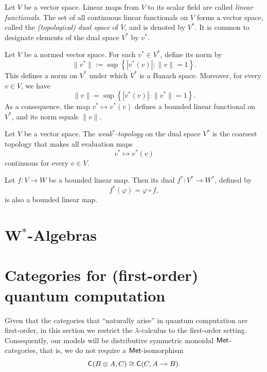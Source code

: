\begin{definition}
  Let $V$ be a vector space. 
  Linear maps from $V$ to its scalar field are called \emph{linear functionals}. The set of all continuous linear functionals on $V$ forms a vector space, called the \emph{(topological) dual space} of $ V $, and is denoted by $V^*$. It is common to designate elements of the dual space \( V^* \)  by \( v^* \).  %
\end{definition}



\begin{theorem} \cite[Theorem 4.3]{rudin91functional} %
Let \( V \) be a normed vector space. For each \( v^* \in V^* \), define its norm by
\[
\|v^*\| := \sup \left\{ | v^*(v) | : \|v\| = 1 \right\}.
\]
This defines a norm on \( V^* \) under which \( V^* \) is a Banach space. Moreover, for every \( v \in V \), we have
\[
\|v\| = \sup \left\{ | v^*(v) | : \|v^*\| = 1 \right\}.
\]
As a consequence, the map \( v^* \mapsto v^*(v)  \) defines a bounded linear functional on \( V^* \), and its norm equals \( \|v\| \).
\end{theorem}

\begin{definition}
Let \( V \) be a vector space. The \emph{weak\(^*\)-topology} on the dual space \( V^* \) is the coarsest topology that makes all evaluation maps
\[
v^* \mapsto v^*(v) 
\]
continuous for every \( v \in V \).
\end{definition}

\begin{proposition} \cite[Proposition 2.3.10]{pedersenAnalysisNow1989}
Let \( f : V \to W \) be a bounded linear map. Then its dual \( f^* : V^* \to W^* \), defined by
\[
f^*(\varphi) = \varphi \circ f,
\]
is also a bounded linear map.
\end{proposition}


\section{W$^*$-Algebras}

\section{Categories for (first-order) quantum computation}

Given that the categories that ``naturally arise'' in quantum computation are first-order, in this section we restrict the $\lambda$-calculus to the first-order setting. Consequently, our models will be distributive symmetric monoidal $\mathsf{Met}$-categories, that is, we do not require a $\mathsf{Met}$-isomorphism
\[
  \mathsf{C}(B \otimes A, C) \cong \mathsf{C}(C, A \multimap B).
\]


